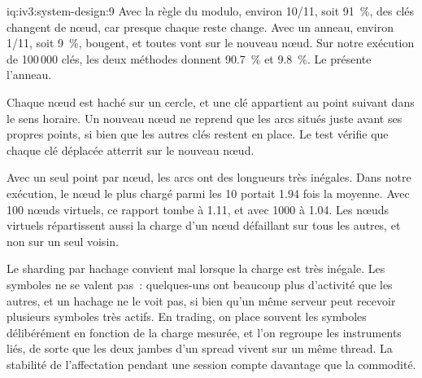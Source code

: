 \begin{solution}{iq:iv3:system-design:9}
Avec la règle du modulo, environ 10/11, soit 91~\%, des clés changent de nœud, car presque chaque reste change. Avec un anneau, environ 1/11, soit 9~\%, bougent, et toutes vont sur le nouveau nœud. Sur notre exécution de 100\,000 clés, les deux méthodes donnent 90.7~\% et 9.8~\%. Le  présente l'anneau.
\label{lst:iv3:sd:ring}

Chaque nœud est haché sur un cercle, et une clé appartient au point suivant dans le sens horaire. Un nouveau nœud ne reprend que les arcs situés juste avant ses propres points, si bien que les autres clés restent en place. Le test vérifie que chaque clé déplacée atterrit sur le nouveau nœud.

Avec un seul point par nœud, les arcs ont des longueurs très inégales. Dans notre exécution, le nœud le plus chargé parmi les 10 portait 1.94 fois la moyenne. Avec 100 nœuds virtuels, ce rapport tombe à 1.11, et avec 1000 à 1.04. Les nœuds virtuels répartissent aussi la charge d'un nœud défaillant sur tous les autres, et non sur un seul voisin.

Le sharding par hachage convient mal lorsque la charge est très inégale. Les symboles ne se valent pas~: quelques-uns ont beaucoup plus d'activité que les autres, et un hachage ne le voit pas, si bien qu'un même serveur peut recevoir plusieurs symboles très actifs. En trading, on place souvent les symboles délibérément en fonction de la charge mesurée, et l'on regroupe les instruments liés, de sorte que les deux jambes d'un spread vivent sur un même thread. La stabilité de l'affectation pendant une session compte davantage que la commodité.

\end{solution}

